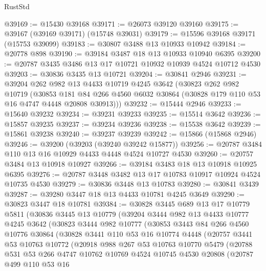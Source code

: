 \begin{lexlean}{RustStd}
\begin{coremodule}
@39169 := @15430 @39168
@39171 := @26073 @39120 @39160
@39175 := @39167 (@39169 @39171) (@15748 @39031)
@39179 := @15596 @39168 @39171 (@15753 @39099)
@39183 := @30807 @3488 @13 @10933 @10942
@39184 := @20778 @898
@39190 := @39184 @3487 @18 @13 @10933 @10940 @6395
@39200 := @20787 @3435 @3486 @13 @17 @10721 @10932 @10939 @4524 @10712 @4530
@39203 := @30836 @3435 @13 @10721
@39204 := @30841 @2946
@39231 := @39204
    @262
    @982
    @13
    @4433
    @10719
    @4245
    @3642
    (@30823
      @262
      @982
      @10719
      (@30853
        @181
        @84
        @266
        @4560
        @6032
        @30864
        (@30828 @179 @110 @53 @16 @4747 @4448 @20808 @30913)))
@39232 := @15444 @2946
@39233 := @15640 @39232
@39234 := @39231 @39233
@39235 := @15514 @3642
@39236 := @15857 @39235
@39237 := @39234 @39236
@39238 := @15538 @3642
@39239 := @15861 @39238
@39240 := @39237 @39239
@39242 := @15866 (@15868 @2946)
@39246 := @39200 (@39203 (@39240 @39242 @15877))
@39256 := @20787 @3484 @110 @13 @16 @10929 @4433 @4448 @4524 @10727 @4530
@39260 := @20757 @3484 @13 @10918 @10927
@39266 := @39184 @3483 @18 @13 @10918 @10925 @6395
@39276 := @20787 @3448 @3482 @13 @17 @10783 @10917 @10924 @4524 @10735 @4530
@39279 := @30836 @3448 @13 @10783
@39280 := @30841 @3439
@39287 := @39280 @3447 @18 @13 @4433 @10781 @4245 @3649
@39290 := @30823 @3447 @18 @10781
@39384 := @30828
    @3445
    @689
    @13
    @17
    @10779
    @5811
    (@30836
      @3445
      @13
      @10779
      (@39204
        @3444
        @982
        @13
        @4433
        @10777
        @4245
        @3642
        (@30823
          @3444
          @982
          @10777
          (@30853
            @3443
            @84
            @266
            @4560
            @10776
            @30864
            (@30828
              @3441
              @110
              @53
              @16
              @10774
              @4448
              (@20757
                @3441
                @53
                @10763
                @10772
                (@20918
                  @988
                  @267
                  @53
                  @10763
                  @10770
                  @5479
                  (@20788
                    @531
                    @53
                    @266
                    @4747
                    @10762
                    @10769
                    @4524
                    @10745
                    @4530
                    @20808
                    (@20787
                      @499
                      @110
                      @53
                      @16

\end{coremodule}
\end{lexlean}
